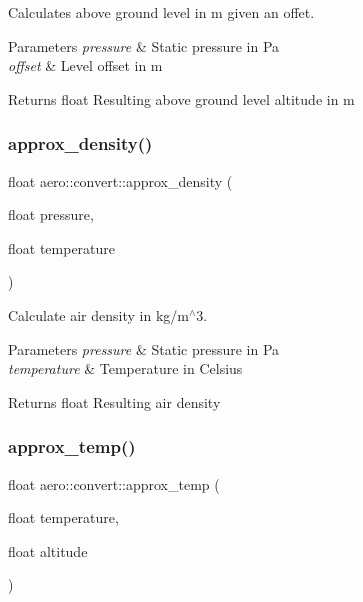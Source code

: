 Calculates above ground level in m given an offet. 


\begin{DoxyParams}{Parameters}
{\em pressure} & Static pressure in Pa \\
\hline
{\em offset} & Level offset in m \\
\hline
\end{DoxyParams}
\begin{DoxyReturn}{Returns}
float Resulting above ground level altitude in m 
\end{DoxyReturn}
\mbox{\label{namespaceaero_1_1convert_a77f3e5181a417c93f2870a4cbede5011}} 
\subsubsection{\texorpdfstring{approx\+\_\+density()}{approx\_density()}}
{\footnotesize\ttfamily float aero\+::convert\+::approx\+\_\+density (\begin{DoxyParamCaption}\item[{float}]{pressure,  }\item[{float}]{temperature }\end{DoxyParamCaption})}



Calculate air density in kg/m$^\wedge$3. 


\begin{DoxyParams}{Parameters}
{\em pressure} & Static pressure in Pa \\
\hline
{\em temperature} & Temperature in Celsius \\
\hline
\end{DoxyParams}
\begin{DoxyReturn}{Returns}
float Resulting air density 
\end{DoxyReturn}
\mbox{\label{namespaceaero_1_1convert_aa3adf5c29a73465ac7f697c906accb33}} 
\subsubsection{\texorpdfstring{approx\+\_\+temp()}{approx\_temp()}}
{\footnotesize\ttfamily float aero\+::convert\+::approx\+\_\+temp (\begin{DoxyParamCaption}\item[{float}]{temperature,  }\item[{float}]{altitude }\end{DoxyParamCaption})}



